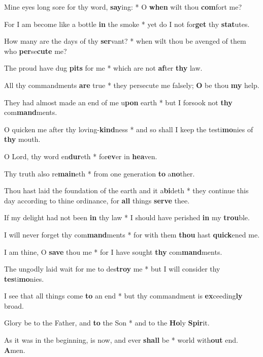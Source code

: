 \begin{multicols}{2}
	Mine eyes long sore for thy word, \textbf{say}ing: * O \textbf{when} wilt thou \textbf{com}fort me?
	
	For I am become like a bottle \textbf{in} the smoke * yet do I not for\textbf{get} thy \textbf{stat}utes.
	
	How many are the days of thy \textbf{ser}vant? * when wilt thou be avenged of them who \textbf{per}se\textbf{cute} me?
	
	The proud have dug \textbf{pits} for me * which are not \textbf{af}ter \textbf{thy} law.
	
	All thy commandments \textbf{are} true * they persecute me falsely; \textbf{O} be thou \textbf{my} help.
	
	They had almost made an end of me u\textbf{pon} earth * but I forsook not \textbf{thy} com\textbf{mand}ments.
	
	O quicken me after thy loving-\textbf{kind}ness * and so shall I keep the testi\textbf{mo}nies of \textbf{thy} mouth.
	
	O Lord, thy word en\textbf{dur}eth * for\textbf{ev}er in \textbf{hea}ven.
	
	Thy truth also re\textbf{main}eth * from one generation \textbf{to} a\textbf{no}ther.
	
	Thou hast laid the foundation of the earth and it a\textbf{bi}deth * they continue this day according to thine ordinance, for \textbf{all} things \textbf{serve} thee.
	
	If my delight had not been \textbf{in} thy law * I should have perished \textbf{in} my \textbf{trou}ble.
	
	I will never forget thy com\textbf{mand}ments * for with them \textbf{thou} hast \textbf{quick}ened me.
	
	I am thine, O \textbf{save} thou me * for I have sought \textbf{thy} com\textbf{mand}ments.
	
	The ungodly laid wait for me to des\textbf{troy} me * but I will consider thy \textbf{tes}ti\textbf{mo}nies.
	
	I see that all things come \textbf{to} an end * but thy commandment is \textbf{ex}ceeding\textbf{ly} broad.
	
	Glory be to the Father, and \textbf{to} the Son * and to the \textbf{Ho}ly \textbf{Spir}it.
	
	As it was in the beginning, is now, and ever \textbf{shall} be * world with\textbf{out} end. \textbf{A}men.
\end{multicols}